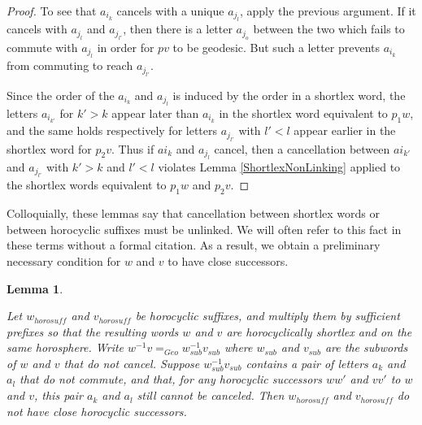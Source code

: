 \documentclass[10pt,a4paper]{amsart}
\newtheorem{lemma}[theorem]{Lemma}
\theoremstyle{definition}
\theoremstyle{remark}
\begin{document}
	\begin{proof}
		
		To see that $a_{i_k}$ cancels with a unique $a_{j_l}$, apply the previous argument. If it cancels with $a_{j_l}$ and $a_{j_{l'}}$, then there is a letter $a_{j_o}$ between the two which fails to commute with $a_{j_l}$ in order for $pv$ to be geodesic. But such a letter prevents $a_{i_k}$ from commuting to reach $a_{j_{l'}}$. 
		
		Since the order of the $a_{i_k}$ and $a_{j_l}$ is induced by the order in a shortlex word, the letters $a_{i_{k'}}$ for $k'>k$ appear later than $a_{i_k}$ in the shortlex word equivalent to $p_1w$, and the same holds respectively for letters $a_{j_{l'}}$ with $l'<l$ appear earlier in the shortlex word for $p_2v$. Thus if $a{i_k}$ and $a_{j_l}$ cancel, then a cancellation between $a{i_{k'}}$ and $a_{j_{l'}}$ with $k'>k$ and $l'<l$ violates Lemma \ref{ShortlexNonLinking} applied to the shortlex words equivalent to $p_1w$ and $p_2v$.	
	\end{proof}
	
	Colloquially, these lemmas say that cancellation between shortlex words or between horocyclic suffixes must be unlinked. We will often refer to this fact in these terms without a formal citation. As a result, we obtain a preliminary necessary condition for $w$ and $v$ to have close successors.
	
	\begin{lemma}\label{DivergenceGraphEdgeNecessaryCondition}
		
		Let $w_{horosuff}$ and $v_{horosuff}$ be horocyclic suffixes, and multiply them by sufficient prefixes so that the resulting words $w$ and $v$ are horocyclically shortlex and on the same horosphere. Write $w^{-1}v=_{Geo}w_{sub}^{-1}v_{sub}$ where $w_{sub}$ and $v_{sub}$ are the subwords of $w$ and $v$ that do not cancel. Suppose $w_{sub}^{-1}v_{sub}$ contains a pair of letters $a_k$ and $a_l$ that do not commute, and that, for any horocyclic successors $ww'$ and $vv'$ to $w$ and $v$, this pair $a_k$ and $a_l$ still cannot be canceled. Then $w_{horosuff}$ and $v_{horosuff}$ do not have close horocyclic successors.
		
	\end{lemma}
	
\end{document}
